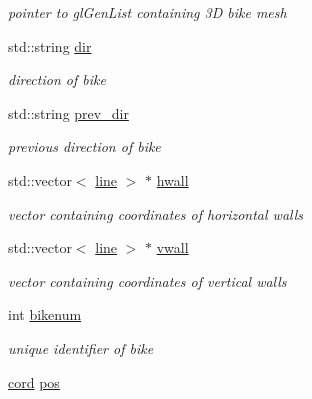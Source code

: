 \begin{DoxyCompactItemize}
\begin{DoxyCompactList}\small\item\em pointer to gl\-Gen\-List containing 3\-D bike mesh \end{DoxyCompactList}\item 
\hypertarget{class_bike_ada81b156c5b12914fc6b06a3dc46bb4a}{std\-::string \hyperlink{class_bike_ada81b156c5b12914fc6b06a3dc46bb4a}{dir}}\label{class_bike_ada81b156c5b12914fc6b06a3dc46bb4a}

\begin{DoxyCompactList}\small\item\em direction of bike \end{DoxyCompactList}\item 
\hypertarget{class_bike_a8f760d363dc6b8ec68133031a8e15bad}{std\-::string \hyperlink{class_bike_a8f760d363dc6b8ec68133031a8e15bad}{prev\-\_\-dir}}\label{class_bike_a8f760d363dc6b8ec68133031a8e15bad}

\begin{DoxyCompactList}\small\item\em previous direction of bike \end{DoxyCompactList}\item 
\hypertarget{class_bike_adbf1ed3b4a794e69623ddce6c691b12c}{std\-::vector$<$ \hyperlink{structline}{line} $>$ $\ast$ \hyperlink{class_bike_adbf1ed3b4a794e69623ddce6c691b12c}{hwall}}\label{class_bike_adbf1ed3b4a794e69623ddce6c691b12c}

\begin{DoxyCompactList}\small\item\em vector containing coordinates of horizontal walls \end{DoxyCompactList}\item 
\hypertarget{class_bike_ad897d0fbf474e6352fc34424c79d2dfd}{std\-::vector$<$ \hyperlink{structline}{line} $>$ $\ast$ \hyperlink{class_bike_ad897d0fbf474e6352fc34424c79d2dfd}{vwall}}\label{class_bike_ad897d0fbf474e6352fc34424c79d2dfd}

\begin{DoxyCompactList}\small\item\em vector containing coordinates of vertical walls \end{DoxyCompactList}\item 
\hypertarget{class_bike_a3afc4e694ca2dcb4850f840bc299d99b}{int \hyperlink{class_bike_a3afc4e694ca2dcb4850f840bc299d99b}{bikenum}}\label{class_bike_a3afc4e694ca2dcb4850f840bc299d99b}

\begin{DoxyCompactList}\small\item\em unique identifier of bike \end{DoxyCompactList}\item 
\hypertarget{class_bike_ad2cd5324bf953525d87fca12c4f78ade}{\hyperlink{classcord}{cord} \hyperlink{class_bike_ad2cd5324bf953525d87fca12c4f78ade}{pos}}\label{class_bike_ad2cd5324bf953525d87fca12c4f78ade}


\end{DoxyCompactItemize}
